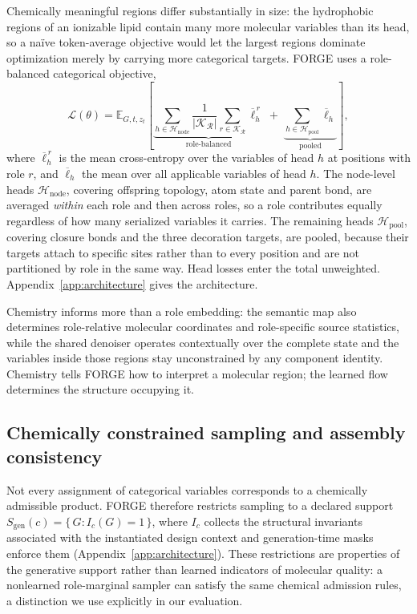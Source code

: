 \documentclass{article}
\newcommand{\Sgen}{\ensuremath{S_{\mathrm{gen}}}}
\begin{document}
Chemically meaningful regions differ substantially in size: the hydrophobic regions of an ionizable
lipid contain many more molecular variables than its head, so a na\"{i}ve token-average objective
would let the largest regions dominate optimization merely by carrying more categorical targets.
FORGE uses a role-balanced categorical objective,
%
\begin{equation}
\label{eq:loss}
\mathcal{L}(\theta)
= \mathbb{E}_{G, t, z_t}\!\left[
\underbrace{\sum_{h \in \mathcal{H}_{\mathrm{node}}}
\frac{1}{|\mathcal{K}_{\mathcal{R}}|}
\sum_{r \in \mathcal{K}_{\mathcal{R}}}
\overline{\ell}_{h}^{\,r}}_{\text{role-balanced}}
\;+\;
\underbrace{\sum_{h \in \mathcal{H}_{\mathrm{pool}}} \overline{\ell}_{h}}_{\text{pooled}}
\right],
\end{equation}
%
where $\overline{\ell}_{h}^{\,r}$ is the mean cross-entropy over the variables of head $h$ at
positions with role $r$, and $\overline{\ell}_{h}$ the mean over all applicable variables of head
$h$. The node-level heads $\mathcal{H}_{\mathrm{node}}$, covering offspring topology, atom state and
parent bond, are averaged \emph{within} each role and then across roles, so a role contributes
equally regardless of how many serialized variables it carries. The remaining heads
$\mathcal{H}_{\mathrm{pool}}$, covering closure bonds and the three decoration targets, are pooled,
because their targets attach to specific sites rather than to every position and are not partitioned
by role in the same way. Head losses enter the total unweighted. Appendix~\ref{app:architecture}
gives the architecture.

Chemistry informs more than a role embedding: the semantic map also determines role-relative molecular
coordinates and role-specific source statistics, while the shared denoiser operates contextually over
the complete state and the variables inside those regions stay unconstrained by any component
identity. Chemistry tells FORGE how to interpret a molecular region; the learned flow determines the
structure occupying it.

\subsection{Chemically constrained sampling and assembly consistency}
\label{sec:support}
Not every assignment of categorical variables corresponds to a chemically admissible product. FORGE
therefore restricts sampling to a declared support $\Sgen(c) = \{\, G : I_c(G) = 1 \,\}$, where $I_c$
collects the structural invariants associated with the instantiated design context and
generation-time masks enforce them (Appendix~\ref{app:architecture}). These restrictions are
properties of the generative support rather than learned indicators of molecular quality: a
nonlearned role-marginal sampler can satisfy the same chemical admission rules, a distinction we use
explicitly in our evaluation.
\end{document}
